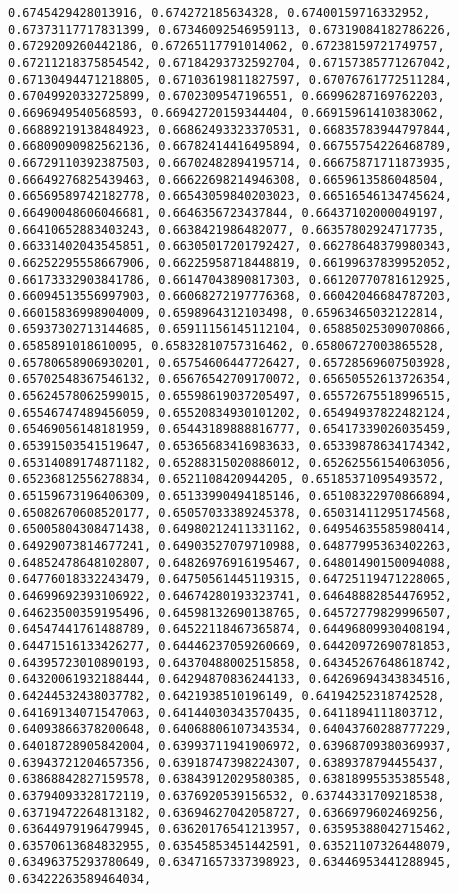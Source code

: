 \documentclass[11pt]{article}
\begin{document}
\begin{Verbatim}[commandchars=\\\{\}]
0.6745429428013916, 0.674272185634328, 0.67400159716332952, 0.67373117717831399, 0.67346092546959113, 0.67319084182786226, 0.6729209260442186, 0.67265117791014062, 0.67238159721749757, 0.67211218375854542, 0.67184293732592704, 0.67157385771267042, 0.67130494471218805, 0.67103619811827597, 0.67076761772511284, 0.67049920332725899, 0.6702309547196551, 0.66996287169762203, 0.6696949540568593, 0.66942720159344404, 0.66915961410383062, 0.66889219138484923, 0.66862493323370531, 0.66835783944797844, 0.66809090982562136, 0.66782414416495894, 0.66755754226468789, 0.66729110392387503, 0.66702482894195714, 0.66675871711873935, 0.66649276825439463, 0.66622698214946308, 0.6659613586048504, 0.66569589742182778, 0.66543059840203023, 0.66516546134745624, 0.66490048606046681, 0.6646356723437844, 0.66437102000049197, 0.66410652883403243, 0.6638421986482077, 0.66357802924717735, 0.66331402043545851, 0.66305017201792427, 0.66278648379980343, 0.66252295558667906, 0.66225958718448819, 0.66199637839952052, 0.66173332903841786, 0.66147043890817303, 0.66120770781612925, 0.66094513556997903, 0.66068272197776368, 0.66042046684787203, 0.66015836998904009, 0.6598964312103498, 0.65963465032122814, 0.65937302713144685, 0.65911156145112104, 0.65885025309070866, 0.6585891018610095, 0.65832810757316462, 0.65806727003865528, 0.65780658906930201, 0.65754606447726427, 0.65728569607503928, 0.65702548367546132, 0.65676542709170072, 0.65650552613726354, 0.65624578062599015, 0.65598619037205497, 0.65572675518996515, 0.65546747489456059, 0.65520834930101202, 0.65494937822482124, 0.65469056148181959, 0.65443189888816777, 0.65417339026035459, 0.65391503541519647, 0.65365683416983633, 0.65339878634174342, 0.65314089174871182, 0.65288315020886012, 0.65262556154063056, 0.65236812556278834, 0.6521108420944205, 0.65185371095493572, 0.65159673196406309, 0.65133990494185146, 0.65108322970866894, 0.65082670608520177, 0.65057033389245378, 0.65031411295174568, 0.65005804308471438, 0.64980212411331162, 0.64954635585980414, 0.64929073814677241, 0.64903527079710988, 0.64877995363402263, 0.64852478648102807, 0.64826976916195467, 0.64801490150094088, 0.64776018332243479, 0.64750561445119315, 0.64725119471228065, 0.64699692393106922, 0.64674280193323741, 0.64648882854476952, 0.64623500359195496, 0.64598132690138765, 0.64572779829996507, 0.64547441761488789, 0.64522118467365874, 0.64496809930408194, 0.64471516133426277, 0.64446237059260669, 0.64420972690781853, 0.64395723010890193, 0.64370488002515858, 0.64345267648618742, 0.64320061932188444, 0.64294870836244133, 0.64269694343834516, 0.64244532438037782, 0.6421938510196149, 0.64194252318742528, 0.64169134071547063, 0.64144030343570435, 0.6411894111803712, 0.64093866378200648, 0.64068806107343534, 0.64043760288777229, 0.64018728905842004, 0.63993711941906972, 0.63968709380369937, 0.63943721204657356, 0.63918747398224307, 0.6389378794455437, 0.63868842827159578, 0.63843912029580385, 0.63818995535385548, 0.63794093328172119, 0.6376920539156532, 0.63744331709218538, 0.63719472264813182, 0.63694627042058727, 0.6366979602469256, 0.63644979196479945, 0.63620176541213957, 0.63595388042715462, 0.63570613684832955, 0.63545853451442591, 0.63521107326448079, 0.63496375293780649, 0.63471657337398923, 0.63446953441288945, 0.63422263589464034, 
\end{Verbatim}
\end{document}
